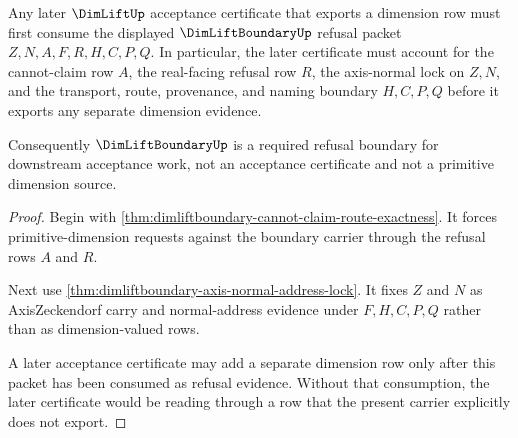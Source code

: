 \begin{theorem}
\label{thm:dimliftboundary-downstream-acceptance-boundary}
Any later $\DimLiftUp$ acceptance certificate that exports a dimension row must first consume the displayed $\DimLiftBoundaryUp$ refusal packet $Z,N,A,F,R,H,C,P,Q$. In particular, the later certificate must account for the cannot-claim row $A$, the real-facing refusal row $R$, the axis-normal lock on $Z,N$, and the transport, route, provenance, and naming boundary $H,C,P,Q$ before it exports any separate dimension evidence.

Consequently $\DimLiftBoundaryUp$ is a required refusal boundary for downstream acceptance work, not an acceptance certificate and not a primitive dimension source.
\end{theorem}
\begin{proof}
Begin with \autoref{thm:dimliftboundary-cannot-claim-route-exactness}. It forces primitive-dimension requests against the boundary carrier through the refusal rows $A$ and $R$.

Next use \autoref{thm:dimliftboundary-axis-normal-address-lock}. It fixes $Z$ and $N$ as AxisZeckendorf carry and normal-address evidence under $F,H,C,P,Q$ rather than as dimension-valued rows.

A later acceptance certificate may add a separate dimension row only after this packet has been consumed as refusal evidence. Without that consumption, the later certificate would be reading through a row that the present carrier explicitly does not export.
\end{proof}

